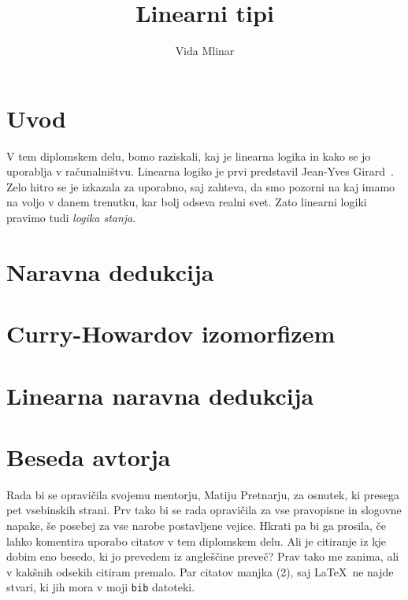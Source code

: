 \documentclass[12pt, titlepage, a4paper]{article}
\title{Linearni tipi}
\author{Vida Mlinar}
\date{}
\newcommand{\cd}[1]{\texttt{#1}}
\begin{document}


\section{Uvod}
V tem diplomskem delu, bomo raziskali, kaj je linearna logika in kako se jo uporablja v računalništvu.
Linearna logiko je prvi predstavil Jean-Yves Girard~\cite{girard1987linear}. Zelo hitro se je izkazala za uporabno, saj zahteva, 
da smo pozorni na kaj imamo na voljo v danem trenutku, kar bolj odseva realni svet. Zato linearni logiki pravimo tudi \emph{logika stanja}. %





\section{Naravna dedukcija\label{natded}} %


\section{Curry-Howardov izomorfizem\label{curr-how}} 



\section{Linearna naravna dedukcija\label{lin}}



\section{Beseda avtorja}
Rada bi se opravičila svojemu mentorju, Matiju Pretnarju, za osnutek, ki presega pet vsebinskih strani. Prv tako  bi se rada opravičila za vse pravopisne in slogovne napake, še posebej za vse narobe postavljene vejice.
Hkrati pa bi ga prosila, če lahko komentira uporabo citatov v tem diplomskem delu. Ali je citiranje iz kje dobim eno besedo, ki jo prevedem iz angleščine preveč? Prav tako me zanima, ali v kakšnih odsekih citiram premalo. Par citatov manjka (2), saj \LaTeX\ ne najde stvari, ki jih mora v moji \cd{bib} datoteki.
\end{document}
